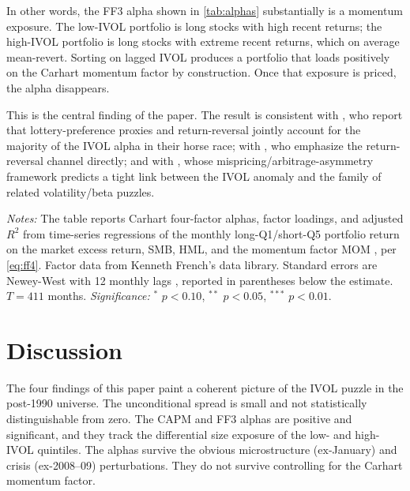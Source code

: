 \documentclass[12pt]{article}
\newcommand{\1}[1]{\mathds{1}\left[#1\right]}
\begin{document}
In other words, the FF3 alpha shown in \cref{tab:alphas} substantially is
a momentum exposure. The low-IVOL portfolio is long stocks with high recent
returns; the high-IVOL portfolio is long stocks with extreme recent returns,
which on average mean-revert. Sorting on lagged IVOL produces a portfolio
that loads positively on the Carhart momentum factor by construction. Once
that exposure is priced, the alpha disappears.

This is the central finding of the paper. The result is consistent with
\citet{hou2016have}, who report that lottery-preference proxies and
return-reversal jointly account for the majority of the IVOL alpha in their
horse race; with \citet{huang2010return}, who emphasize the return-reversal
channel directly; and with \citet{stambaugh2015arbitrage}, whose
mispricing/arbitrage-asymmetry framework predicts a tight link between the
IVOL anomaly and the family of related volatility/beta puzzles.

\begin{table}[H]
\centering
\begin{threeparttable}
\caption{Carhart four-factor alphas of the long-Q1/short-Q5 portfolio,
1990--2024}\label{tab:ff4}
\small

\begin{tablenotes}\small
\item \textit{Notes:} The table reports Carhart four-factor alphas, factor
loadings, and adjusted $R^2$ from time-series regressions of the monthly
long-Q1/short-Q5 portfolio return on the market excess return, SMB, HML, and
the momentum factor MOM \citep{carhart1997persistence}, per \eqref{eq:ff4}.
Factor data from Kenneth French's data library. Standard errors are
Newey-West with 12 monthly lags \citep{newey1987simple}, reported in
parentheses below the estimate. $T=411$ months. \emph{Significance:}
$^{*}$ $p<0.10$, $^{**}$ $p<0.05$, $^{***}$ $p<0.01$.
\end{tablenotes}
\end{threeparttable}
\end{table}

\section{Discussion}\label{sec:discussion}

The four findings of this paper paint a coherent picture of the IVOL puzzle
in the post-1990 universe. The unconditional spread is small and not
statistically distinguishable from zero. The CAPM and FF3 alphas are positive
and significant, and they track the differential size exposure of the low- and
high-IVOL quintiles. The alphas survive the obvious microstructure
($\mathrm{ex}$-January) and crisis (ex-2008--09) perturbations. They do not
survive controlling for the Carhart momentum factor.
\end{document}
